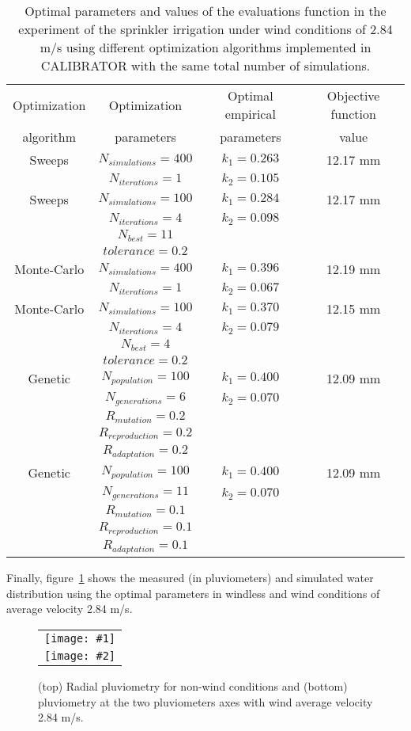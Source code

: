 \documentclass[review,authoryear]{elsarticle}
\newcommand{\TABLE}[5]
{
	\begin{table}[ht!]
		\centering
		\caption{#4.\label{#5}}
		#1
		\begin{tabular}{#2}
			#3
		\end{tabular}
	\end{table}
}
\newcommand{\FIGII}[4]
{
	\begin{figure}[ht!]
		\centering
		\begin{tabular}{c}
			\texttt{[image: \#1]} \\ \texttt{[image: \#2]}
		\end{tabular}
		\caption{#3.\label{#4}}
	\end{figure}
}
\begin{document}
\TABLE{\scriptsize}{cccc}
{
	Optimization & Optimization & Optimal empirical & Objective function
	\\ algorithm & parameters & parameters & value
	\\ \hline
	Sweeps & $N_{simulations}=400$ & $k_1=0.263$ & 12.17 mm
	\\ & $N_{iterations}=1$ & $k_2=0.105$
	\\ \hline
	Sweeps & $N_{simulations}=100$ & $k_1=0.284$ & 12.17 mm
	\\ & $N_{iterations}=4$ & $k_2=0.098$
	\\ & $N_{best}=11$
	\\ & $tolerance=0.2$
	\\ \hline
	Monte-Carlo & $N_{simulations}=400$ & $k_1=0.396$ & 12.19 mm
	\\ & $N_{iterations}=1$ & $k_2=0.067$
	\\ \hline
	Monte-Carlo & $N_{simulations}=100$ & $k_1=0.370$ & 12.15 mm
	\\ & $N_{iterations}=4$ & $k_2=0.079$
	\\ & $N_{best}=4$
	\\ & $tolerance=0.2$
	\\ \hline
	Genetic & $N_{population}=100$ & $k_1=0.400$ & 12.09 mm
	\\ & $N_{generations}=6$ & $k_2=0.070$
	\\ & $R_{mutation}=0.2$
	\\ & $R_{reproduction}=0.2$
	\\ & $R_{adaptation}=0.2$
	\\ \hline
	Genetic & $N_{population}=100$ & $k_1=0.400$ & 12.09 mm
	\\ & $N_{generations}=11$ & $k_2=0.070$
	\\ & $R_{mutation}=0.1$
	\\ & $R_{reproduction}=0.1$
	\\ & $R_{adaptation}=0.1$
	\\ \hline
}{Optimal parameters and values of the evaluations function in the experiment of the sprinkler irrigation under wind conditions of 2.84 m/s using different optimization algorithms implemented in CALIBRATOR with the same total number of simulations}{TabSprinklerII}

Finally, figure~\ref{FigSprinkler} shows the measured (in pluviometers) and simulated water distribution using the optimal parameters in windless and wind conditions of average velocity 2.84 m/s.

\FIGII{sprinkler-0.eps}{sprinkler-2,84.eps}
{(top) Radial pluviometry for non-wind conditions and (bottom) pluviometry at
the two pluviometers axes with wind average velocity 2.84 m/s}{FigSprinkler}
\end{document}
